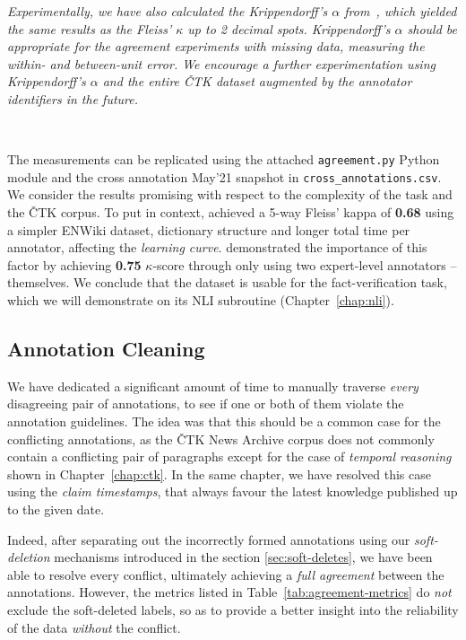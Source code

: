 \textit{Experimentally, we have also calculated the Krippendorff's $\alpha$ from~\cite{krippendorff2013content}, which yielded the same results as the Fleiss' $\kappa$ up to 2 decimal spots. Krippendorff's $\alpha$ should be appropriate for the agreement experiments with missing data, measuring the within- and between-unit error. We encourage a further experimentation using Krippendorff's $\alpha$ and the entire \textsf{ČTK} dataset augmented by the annotator identifiers in the future.}

~

The measurements can be replicated using the attached \texttt{agreement.py} \textsf{Python} module and the cross annotation May'21 snapshot in \texttt{cross\_annotations.csv}. We consider the results promising with respect to the complexity of the \tdva{} task and the \textsf{ČTK} corpus. To put in context, \cite{fever} achieved a 5-way Fleiss' kappa of \textbf{0.68} using a simpler \textsf{ENWiki} dataset, dictionary structure and longer total time per annotator, affecting the \textit{learning curve}. \cite{danish} demonstrated the importance of this factor by achieving \textbf{0.75} $\kappa$-score through only using two expert-level annotators -- themselves. We conclude that the dataset is usable for the fact-verification task, which we will demonstrate on its NLI subroutine (Chapter~\ref{chap:nli}).


\subsection{Annotation Cleaning}
\label{sec:cleaning}
We have dedicated a significant amount of time to manually traverse \textit{every} disagreeing pair of annotations, to see if one or both of them violate the annotation guidelines. The idea was that this should be a common case for the conflicting annotations, as the \textsf{ČTK News Archive} corpus does not commonly contain a conflicting pair of paragraphs except for the case of \textit{temporal reasoning} shown in Chapter~\ref{chap:ctk}. In the same chapter, we have resolved this case using the \textit{claim timestamps}, that always favour the latest knowledge published up to the given date.

Indeed, after separating out the incorrectly formed annotations using our \textit{soft-deletion} mechanisms introduced in the section \ref{sec:soft-deletes}, we have been able to resolve every conflict, ultimately achieving a \textit{full agreement} between the annotations. However, the metrics listed in Table~\ref{tab:agreement-metrics} do \textit{not} exclude the soft-deleted labels, so as to provide a better insight into the reliability of the data \textit{without} the conflict.

